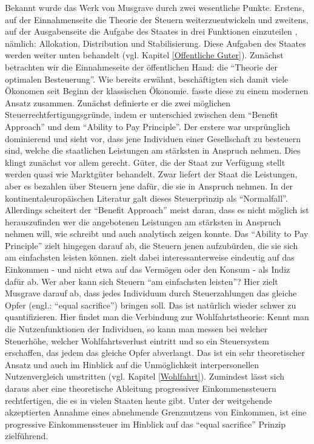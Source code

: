 Bekannt wurde das Werk von Musgrave durch zwei wesentliche Punkte. Erstens, auf der Einnahmenseite die Theorie der Steuern weiterzuentwickeln \parencite{Musgrave1959} und zweitens, auf der Ausgabenseite die Aufgabe des Staates in drei Funktionen einzuteilen \parencite{Musgrave1956, Musgrave1959}, nämlich: Allokation, Distribution und Stabilisierung. Diese Aufgaben des Staates werden weiter unten behandelt (vgl. Kapitel \ref{Offentliche Guter}). Zunächst betrachten wir die Einnahmeseite der öffentlichen Hand: die "`Theorie der optimalen Besteuerung"'. Wie bereits erwähnt, beschäftigten sich damit viele Ökonomen seit Beginn der klassischen Ökonomie. \textcite{Musgrave1959} fasste diese zu einem modernen Ansatz zusammen. Zunächst definierte er die zwei möglichen Steuerrechtfertigungsgründe, indem er unterschied zwischen dem "`Benefit Approach"' und dem "`Ability to Pay Principle"'. Der erstere war ursprünglich dominierend und sieht vor, dass jene Individuen einer Gesellschaft zu besteuern sind, welche die staatlichen Leistungen am stärksten in Anspruch nehmen. Dies klingt zunächst vor allem gerecht. Güter, die der Staat zur Verfügung stellt werden quasi wie Marktgüter behandelt. Zwar liefert der Staat die Leistungen, aber es bezahlen über Steuern jene dafür, die sie in Anspruch nehmen. In der kontinentaleuropäischen Literatur galt dieses Steuerprinzip als "`Normalfall"'. Allerdings scheitert der "`Benefit Approach"' meist daran, dass es nicht möglich ist herauszufinden wer die angebotenen Leistungen am stärksten in Anspruch nehmen will, wie \textcite{Musgrave1959} schreibt und \textcite{Samuelson1954} auch analytisch zeigen konnte. Das "`Ability to Pay Principle"' zielt hingegen darauf ab, die Steuern jenen aufzubürden, die sie sich am einfachsten leisten können. \textcite{Musgrave1959} zielt dabei interessanterweise eindeutig auf das Einkommen - und nicht etwa auf das Vermögen oder den Konsum - als Indiz dafür ab. Wer aber kann sich Steuern "`am einfachsten leisten"'? Hier zielt Musgrave darauf ab, dass jedes Individuum durch Steuerzahlungen das gleiche Opfer (engl.: "`equal sacrifice"') bringen soll. Das ist natürlich wieder schwer zu quantifizieren. Hier findet man die Verbindung zur Wohlfahrtstheorie: Kennt man die Nutzenfunktionen der Individuen, so kann man messen bei welcher Steuerhöhe, welcher Wohlfahrtsverlust eintritt und so ein Steuersystem erschaffen, das jedem das gleiche Opfer abverlangt. Das ist ein sehr theoretischer Ansatz und auch im Hinblick auf die Unmöglichkeit interpersonellen Nutzenvergleich umstritten (vgl. Kapitel \ref{Wohlfahrt}). Zumindest lässt sich daraus aber eine theoretische Ableitung progressiver Einkommenssteuern rechtfertigen, die es in vielen Staaten heute gibt. Unter der weitgehende akzeptierten Annahme eines abnehmende Grenznutzens von Einkommen, ist eine progressive Einkommenssteuer im Hinblick auf das "`equal sacrifice"' Prinzip zielführend.  

